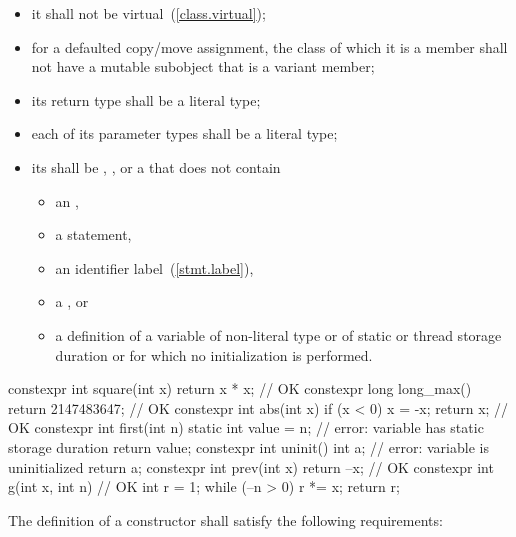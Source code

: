 \begin{itemize}
\item
it shall not be virtual~(\ref{class.virtual});

\item
for a defaulted copy/move assignment, the class of which it is a member
shall not have a mutable subobject that is a variant member;

\item
its return type shall be a literal type;

\item
each of its parameter types shall be a literal type;

\item
its  shall be
, , or
a 
that does not contain

\begin{itemize}
\item an ,
\item a  statement,
\item an identifier label~(\ref{stmt.label}),
\item a , or
\item a definition of a variable
of non-literal type or
of static or thread storage duration or
for which no initialization is performed.
\end{itemize}

\end{itemize}

\begin{example}
\begin{codeblock}
constexpr int square(int x) 
  { return x * x; }             // OK
constexpr long long_max() 
  { return 2147483647; }        // OK
constexpr int abs(int x) {
  if (x < 0)
    x = -x;
  return x;                     // OK
}
constexpr int first(int n) {
  static int value = n;         // error: variable has static storage duration
  return value;
}
constexpr int uninit() {
  int a;                        // error: variable is uninitialized
  return a;
}
constexpr int prev(int x)
  { return --x; }               // OK
constexpr int g(int x, int n) { // OK
  int r = 1;
  while (--n > 0) r *= x;
  return r;
}
\end{codeblock}
\end{example}

\pnum
{}%
The definition of a  constructor shall satisfy the
following requirements:

